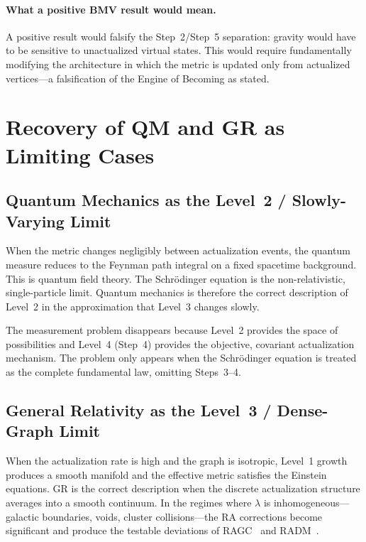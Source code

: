 \documentclass[11pt,a4paper]{article}
\theoremstyle{plain}
\theoremstyle{definition}
\theoremstyle{remark}
\begin{document}
\paragraph{What a positive BMV result would mean.}
A positive result would falsify the Step~2/Step~5 separation: gravity would
have to be sensitive to unactualized virtual states. This would require
fundamentally modifying the architecture in which the metric is updated only
from actualized vertices---a falsification of the Engine of Becoming as stated.

\section{Recovery of QM and GR as Limiting Cases}
\label{sec:limits}

\subsection{Quantum Mechanics as the Level~2 / Slowly-Varying Limit}

When the metric changes negligibly between actualization events, the quantum
measure reduces to the Feynman path integral on a fixed spacetime background.
This is quantum field theory. The Schr\"{o}dinger equation is the
non-relativistic, single-particle limit. Quantum mechanics is therefore the
correct description of Level~2 in the approximation that Level~3 changes slowly.

The measurement problem disappears because Level~2 provides the space of
possibilities and Level~4 (Step~4) provides the objective, covariant
actualization mechanism. The problem only appears when the Schr\"{o}dinger
equation is treated as the complete fundamental law, omitting Steps~3--4.

\subsection{General Relativity as the Level~3 / Dense-Graph Limit}

When the actualization rate is high and the graph is isotropic, Level~1 growth
produces a smooth manifold and the effective metric satisfies the Einstein
equations. GR is the correct description when the discrete actualization
structure averages into a smooth continuum. In the regimes where $\lambda$ is
inhomogeneous---galactic boundaries, voids, cluster collisions---the RA
corrections become significant and produce the testable deviations of
RAGC~\citep{Sandeman2026b} and RADM~\citep{Sandeman2026RADM}.
\end{document}

